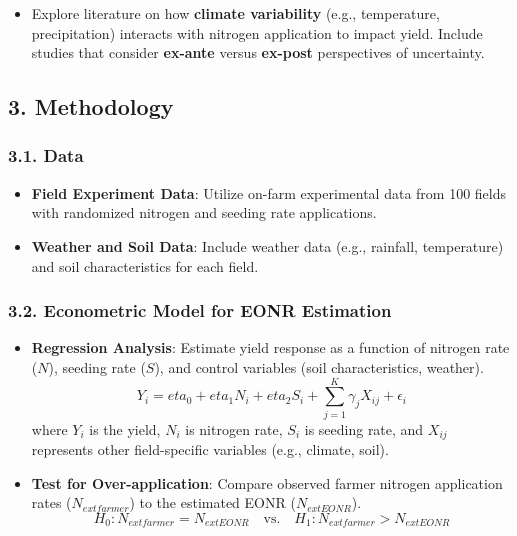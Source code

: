 \documentclass[
]{article}
\providecommand{\tightlist}{%
  \setlength{\itemsep}{0pt}\setlength{\parskip}{0pt}}\usepackage{longtable,booktabs,array}
\begin{document}
\begin{itemize}
\tightlist
\item
  Explore literature on how \textbf{climate variability} (e.g.,
  temperature, precipitation) interacts with nitrogen application to
  impact yield. Include studies that consider \textbf{ex-ante} versus
  \textbf{ex-post} perspectives of uncertainty.
\end{itemize}

\subsection{3. Methodology}\label{methodology}

\subsubsection{3.1. Data}\label{data}

\begin{itemize}
\tightlist
\item
  \textbf{Field Experiment Data}: Utilize on-farm experimental data from
  100 fields with randomized nitrogen and seeding rate applications.
\item
  \textbf{Weather and Soil Data}: Include weather data (e.g., rainfall,
  temperature) and soil characteristics for each field.
\end{itemize}

\subsubsection{3.2. Econometric Model for EONR
Estimation}\label{econometric-model-for-eonr-estimation}

\begin{itemize}
\item
  \textbf{Regression Analysis}: Estimate yield response as a function of
  nitrogen rate (\(N\)), seeding rate (\(S\)), and control variables
  (soil characteristics, weather). \[
  Y_i =eta_0 +eta_1 N_i + eta_2 S_i + \sum_{j=1}^{K} \gamma_j X_{ij} + \epsilon_i
  \] where \(Y_i\) is the yield, \(N_i\) is nitrogen rate, \(S_i\) is
  seeding rate, and \(X_{ij}\) represents other field-specific variables
  (e.g., climate, soil).
\item
  \textbf{Test for Over-application}: Compare observed farmer nitrogen
  application rates (\(N_{   ext{farmer}}\)) to the estimated EONR
  (\(N_{  ext{EONR}}\)). \[
  H_0: N_{  ext{farmer}} = N_{  ext{EONR}} \quad \text{vs.} \quad H_1: N_{  ext{farmer}} > N_{  ext{EONR}}
  \]
\end{itemize}
\end{document}
